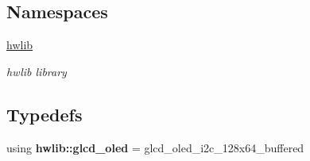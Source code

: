 \subsection*{Namespaces}
\begin{DoxyCompactItemize}
\item 
 \hyperlink{namespacehwlib}{hwlib}
\begin{DoxyCompactList}\small\item\em hwlib library \end{DoxyCompactList}\end{DoxyCompactItemize}
\subsection*{Typedefs}
\begin{DoxyCompactItemize}
\item 
\mbox{\label{namespacehwlib_acfb754055c5d4981e94b750203dcca3a}} 
using {\bfseries hwlib\+::glcd\+\_\+oled} = glcd\+\_\+oled\+\_\+i2c\+\_\+128x64\+\_\+buffered
\end{DoxyCompactItemize}
